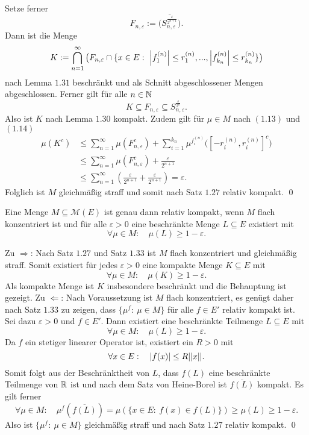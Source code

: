 \begin{proof*}
\begin{align}
    \end{align}
    Setze ferner
    $$
        F_{n,\varepsilon} := \overline{\big(S_{n,\varepsilon}^{\frac{\varepsilon}{2^{n+1}}}\big)}.
    $$
    Dann ist die Menge 
    $$
        K := \bigcap_{n =1}^{\infty}\big(F_{n, \varepsilon} \cap\{x \in E: \ \left| f_1^{(n)} \right|\leq r_1^{(n)},...,\left| f_{k_n}^{(n)} \right|\leq r_{k_n}^{(n)}\}\big)
    $$
    nach Lemma $1.31$ beschränkt und als Schnitt abgeschlossener Mengen abgeschlossen. Ferner gilt für alle $n \in \mathbb{N}$
    $$
        K \subseteq  F_{n, \varepsilon} \subseteq S_{n,\varepsilon}^{\frac{\varepsilon}{2^n}}.
    $$
    Also ist $K$ nach Lemma $1.30$ kompakt. Zudem gilt für $\mu \in M$ nach $(1.13)$ und $(1.14)$
    \begin{align*}
        \mu(K^c) &\leq \sum_{n=1}^{\infty}\mu(F_{n, \varepsilon}^c) + \sum_{i=1}^{k_n}\mu^{f_i^{(n)}}\big([-r_i^{(n)}, r_i^{(n)}]^c\big) \\\
                 &\leq \sum_{n=1}^{\infty}\mu(F_{n, \varepsilon}^c) + \frac{\varepsilon}{2^{n+1}} \\\
                 &\leq \sum_{n=1}^{\infty}(\frac{\varepsilon}{2^{n+1}} + \frac{\varepsilon}{2^{n+1}}) = \varepsilon. 
    \end{align*}
    Folglich ist $M$ gleichmäßig straff und somit nach Satz $1.27$ relativ kompakt. \qed
\end{proof*}

\begin{corollary}
    Eine Menge $M \subseteq \mathcal{M}(E)$ ist genau dann relativ kompakt, wenn $M$ flach konzentriert ist und für alle $\varepsilon > 0$ eine beschränkte Menge $L \subseteq E$ existiert mit
    $$
        \forall \mu \in M: \quad \mu(L) \geq 1 - \varepsilon. 
    $$
\end{corollary}

\begin{proof*}
    Zu $\Rightarrow$: Nach Satz $1.27$ und Satz $1.33$ ist $M$ flach konzentriert und gleichmäßig straff. Somit existiert für jedes $\varepsilon > 0$ eine kompakte Menge $K \subseteq E$ mit 
    $$
        \forall \mu \in M: \quad \mu(K) \geq 1 - \varepsilon. 
    $$
    Als kompakte Menge ist $K$ insbesondere beschränkt und die Behauptung ist gezeigt.
    \newline  
    Zu $\Leftarrow$: Nach Voraussetzung ist $M$ flach konzentriert, es genügt daher nach Satz $1.33$ zu zeigen, dass $\{\mu^f : \ \mu \in M\}$ für alle $f \in E'$ relativ kompakt ist. Sei dazu $\varepsilon > 0$ und $f \in E'$. 
    Dann existiert eine beschränkte Teilmenge $L \subseteq E$ mit
    $$
        \forall \mu \in M: \quad \mu(L) \geq 1 - \varepsilon.
    $$
    Da $f$ ein stetiger linearer Operator ist, existiert ein $R > 0$ mit 
    $$
        \forall x \in E: \quad \left| f(x) \right| \leq R \lvert\lvert x \rvert\rvert. 
    $$
    Somit folgt aus der Beschränktheit von $L$, dass $f(L)$ eine beschränkte Teilmenge von $\mathbb{R}$ ist und nach dem Satz von Heine-Borel ist $\overline{f(L)}$ kompakt. Es gilt ferner
    $$
        \forall \mu \in M: \quad \mu^f(\overline{f(L)}) = \mu(\{x \in E: \ f(x) \in f(L)\}) \geq \mu(L) \geq 1 - \varepsilon. 
    $$
    Also ist $\{\mu^f : \ \mu \in M\}$ gleichmäßig straff und nach Satz $1.27$ relativ kompakt. \qed
\end{proof*}


